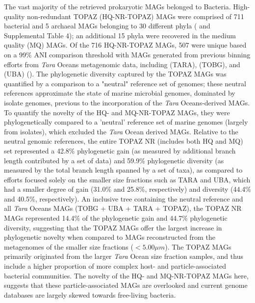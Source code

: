 \documentclass[12pt]{article}
\numberwithin{equation}{section}
\begin{document}
The vast majority of the retrieved prokaryotic MAGs belonged to Bacteria. High-quality non-redundant TOPAZ (HQ-NR-TOPAZ) MAGs were comprised of 711 bacterial and 5 archaeal MAGs belonging to 30 different phyla ( and Supplemental Table 4); an additional 15 phyla were recovered in the medium quality (MQ) MAGs. Of the 716 HQ-NR-TOPAZ MAGs, 507 were unique based on a 99\% ANI comparison threshold with MAGs generated from previous binning efforts from \textit{Tara} Oceans metagenomic data, including \citet{Delmont2018Nitrogen-fixing} (TARA), \citet{Tully2018reconstruction} (TOBG), and \citet{Parks2017Recovery} (UBA) (). The phylogenetic diversity captured by the TOPAZ MAGs was quantified by a comparison to a "neutral" reference set of genomes; these neutral references approximate the state of marine microbial genomes, dominated by isolate genomes, previous to the incorporation of the \textit{Tara} Oceans-derived MAGs. To quantify the novelty of the HQ- and MQ-NR-TOPAZ MAGs, they were phylogenetically compared to a 'neutral' reference set of marine genomes (largely from isolates), which excluded the \textit{Tara} Ocean derived MAGs. Relative to the neutral genomic references, the entire TOPAZ NR (includes both HQ and MQ) set represented a 42.8\% phylogenetic gain (as measured by additional branch length contributed by a set of data) and 59.9\% phylogenetic diversity (as measured by the total branch length spanned by a set of taxa), as compared to efforts focused solely on the smaller size fractions such as TARA and UBA, which had a smaller degree of gain (31.0\% and 25.8\%, respectively) and diversity (44.4\% and 40.5\%, respectively). An inclusive tree containing the neutral reference and all \textit{Tara} Oceans MAGs (TOBG + UBA + TARA + TOPAZ), the TOPAZ NR MAGs represented 14.4\% of the phylogenetic gain and 44.7\% phylogenetic diversity, suggesting that the TOPAZ MAGs offer the largest increase in phylogenetic novelty when compared to MAGs reconstructed from the metagenomes of the smaller size fractions ($<5.00 \mu m$). The TOPAZ MAGs primarily originated from the larger \textit{Tara} Ocean size fraction samples, and thus include a higher proportion of more complex host- and particle-associated bacterial communities. The novelty of the HQ- and MQ-NR-TOPAZ MAGs here, suggests that these particle-associated MAGs are overlooked and current genome databases are largely skewed towards free-living bacteria.

\end{document}
